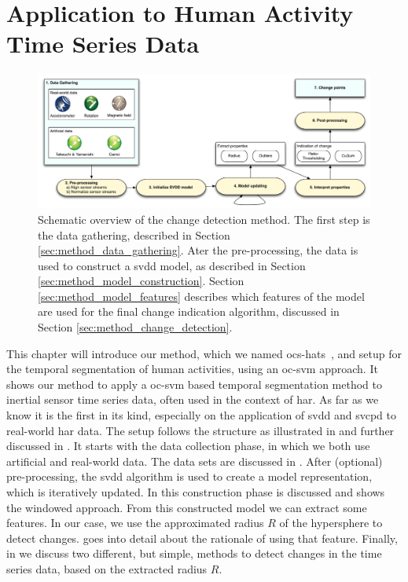 
\chapter{Application to Human Activity Time Series Data}

\label{Chapter4} %


\begin{figure}
  \centering
    \includegraphics[width=\textwidth]{./Figures/chapter4/method_setup.pdf}
  \caption[Method setup]{Schematic overview of the change detection method. The first step is the data gathering, described in Section \ref{sec:method_data_gathering}. Ater the pre-processing, the data is used to construct a \gls{svdd} model, as described in Section \ref{sec:method_model_construction}. Section \ref{sec:method_model_features} describes which features of the model are used for the final change indication algorithm, discussed in Section \ref{sec:method_change_detection}.}
  \label{fig:method_overview}
\end{figure}

This chapter will introduce our method, which we named \gls{ocs-hats}~\cite{vlasveld2014hats}, and setup for the temporal segmentation of human activities, using an \gls{oc-svm} approach.
It shows our method to apply a \gls{oc-svm} based temporal segmentation method to inertial sensor time series data, often used in the context of \acrlong{har}.
As far as we know it is the first in its kind, especially on the application of \gls{svdd} and \gls{svcpd} to real-world \gls{har} data.
The setup follows the structure as illustrated in  and further discussed in .
It starts with the data collection phase, in which we both use artificial and real-world data.
The data sets are discussed in .
After (optional) pre-processing, the \gls{svdd} algorithm is used to create a model representation, which is iteratively updated.
In  this construction phase is discussed and shows the windowed approach.
From this constructed model we can extract some features.
In our case, we use the approximated radius $R$ of the hypersphere to detect changes.
 goes into detail about the rationale of using that feature.
Finally, in  we discuss two different, but simple, methods to detect changes in the time series data, based on the extracted radius $R$.





